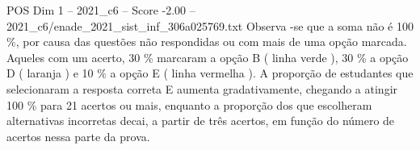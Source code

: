 \begin{textsample}{POS Dim 1 – 2021\_c6 – Score -2.00 – 2021\_c6/enade\_2021\_sist\_inf\_306a025769.txt}
Observa -se que a soma não é 100 \%, por causa das questões não respondidas ou com mais de uma opção marcada.
Aqueles com um acerto, 30 \% marcaram a opção B ( linha verde ), 30 \% a opção D ( laranja ) e 10 \% a opção E ( linha vermelha ).
A proporção de estudantes que selecionaram a resposta correta E aumenta gradativamente, chegando a atingir 100 \% para 21 acertos ou mais, enquanto a proporção dos que escolheram alternativas incorretas decai, a partir de três acertos, em função do número de acertos nessa parte da prova.

\end{textsample}

